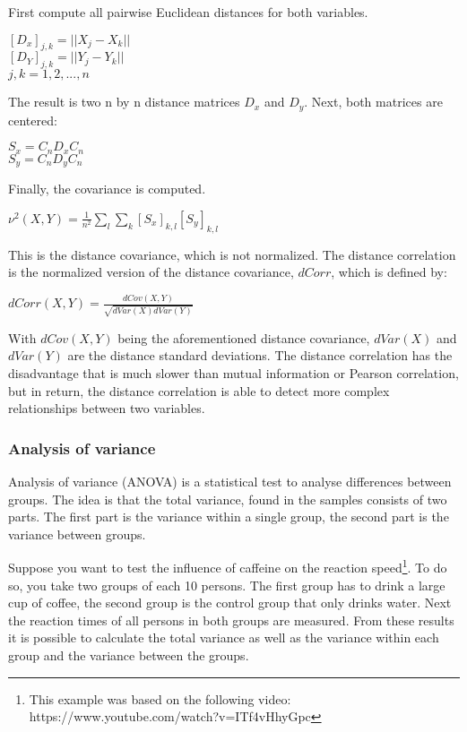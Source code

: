 First compute all pairwise Euclidean distances for both variables.
\begin{center}
$[D_x]_{j,k} = || X_j - X_k||$ \\
$[D_Y]_{j,k} = || Y_j - Y_k||$ \\
$j,k = 1,2,...,n$\\
\end{center}
The result is two n by n distance matrices $D_x$ and $D_y$. Next, both matrices are centered:
\begin{center}
$S_x = C_nD_xC_n$\\
$S_y = C_nD_yC_n$\\
\end{center}
Finally, the covariance is computed.
\begin{center}
$\nu^2(X,Y) = \frac{1}{n^2} \sum\limits_l \sum\limits_k [S_x]_{k,l}[S_y]_{k,l}$ 
\end{center}

This is the distance covariance, which is not normalized. The distance correlation is the normalized version of the distance covariance, $dCorr$, which is defined by:

\begin{center}
$dCorr(X,Y) = \frac{dCov(X,Y)}{\sqrt{dVar(X)dVar(Y)}}$
\end{center}
With $dCov(X,Y)$ being the aforementioned distance covariance, $dVar(X)$ and $dVar(Y)$ are the distance standard deviations. The distance correlation has the disadvantage that is much slower than mutual information or Pearson correlation, but in return, the distance correlation is able to detect more complex relationships between two variables.

\subsubsection{Analysis of variance}

Analysis of variance (ANOVA) is a statistical test to analyse differences between groups. The idea is that the total variance, found in the samples consists of two parts. The first part is the variance within a single group, the second part is the variance between groups. 

\npar

Suppose you want to test the influence of caffeine on the reaction speed\footnote{This example was based on the following video: https://www.youtube.com/watch?v=ITf4vHhyGpc}. To do so, you take two groups of each 10 persons. The first group has to drink a large cup of coffee, the second group is the control group that only drinks water. Next the reaction times of all persons in both groups are measured. From these results it is possible to calculate the total variance as well as the variance within each group and the variance between the groups. 

